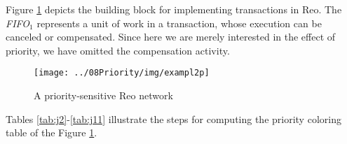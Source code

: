 \begin{BehExample}
\label{ex:mesalbozorg}
Figure \ref{fig:mesalebozorg} depicts the building block for implementing transactions in Reo. The \emph{FIFO}$_1$ represents a unit of work in a transaction, whose execution can be canceled or compensated. Since here we are merely interested in the effect of priority, we have omitted the compensation activity. %

\begin{figure}[h]
\texttt{[image: ../08Priority/img/exampl2p]}
\caption{A priority-sensitive Reo network}
\label{fig:mesalebozorg}
\end{figure}



 Tables \ref{tab:j2}-\ref{tab:j11} illustrate the steps for computing the priority coloring table of the Figure \ref{fig:mesalebozorg}.  
%



\end{BehExample}
